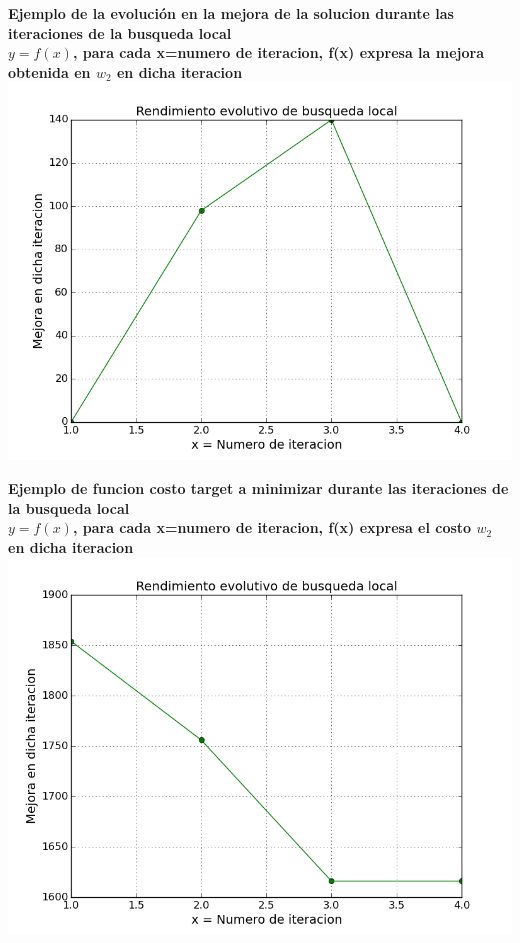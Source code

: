 \vspace{1cm}

\begin{center}
	\textbf{Ejemplo de la evoluci\'on en la mejora de la solucion durante las iteraciones de la busqueda local}\\
	\textbf{$y = f(x)$, para cada x=numero de iteracion, f(x) expresa la mejora obtenida en $w_2$ en dicha iteracion}\\
	\includegraphics[scale=0.7]{experimentos/bqlocal/rendimiento_evolutivo_absoluto_lineal/bqlocal/instancia_500_4999_in_iters_w2_differential.png}
\end{center}

\begin{center}
	\textbf{Ejemplo de funcion costo target a minimizar durante las iteraciones de la busqueda local}\\
	\textbf{$y = f(x)$, para cada x=numero de iteracion, f(x) expresa el costo $w_2$ en dicha iteracion}\\
	\includegraphics[scale=0.7]{experimentos/bqlocal/rendimiento_evolutivo_absoluto_lineal/bqlocal/instancia_500_4999_in_iters_w2_absolute_value.png}
\end{center}


